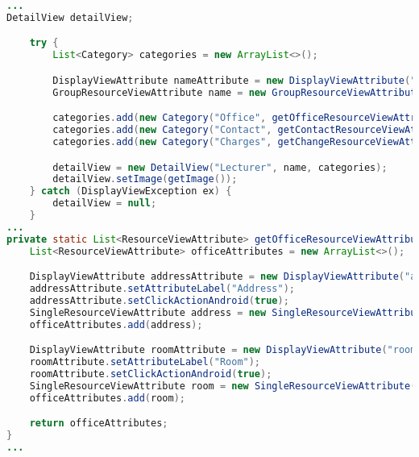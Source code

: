 \newpage

\begin{lstlisting}[label=lst:detailview_impl,
language=java,
firstnumber=1,
caption=Erstellung einer \textit{DetailView}.]				   
...
DetailView detailView;

	try {
		List<Category> categories = new ArrayList<>();

		DisplayViewAttribute nameAttribute = new DisplayViewAttribute("name", ViewAttribute.AttributeType.TEXT);
		GroupResourceViewAttribute name = new GroupResourceViewAttribute(nameAttribute, getViewTitleAttributes());

		categories.add(new Category("Office", getOfficeResourceViewAttributes()));
		categories.add(new Category("Contact", getContactResourceViewAttributes()));
		categories.add(new Category("Charges", getChangeResourceViewAttributes()));

		detailView = new DetailView("Lecturer", name, categories);
		detailView.setImage(getImage());
	} catch (DisplayViewException ex) {
		detailView = null;
	}
...
private static List<ResourceViewAttribute> getOfficeResourceViewAttributes() {
	List<ResourceViewAttribute> officeAttributes = new ArrayList<>();

	DisplayViewAttribute addressAttribute = new DisplayViewAttribute("address", ViewAttribute.AttributeType.LOCATION);
	addressAttribute.setAttributeLabel("Address");
	addressAttribute.setClickActionAndroid(true);
	SingleResourceViewAttribute address = new SingleResourceViewAttribute(addressAttribute);
	officeAttributes.add(address);

	DisplayViewAttribute roomAttribute = new DisplayViewAttribute("roomNumber", ViewAttribute.AttributeType.TEXT);
	roomAttribute.setAttributeLabel("Room");
	roomAttribute.setClickActionAndroid(true);
	SingleResourceViewAttribute room = new SingleResourceViewAttribute(roomAttribute);
	officeAttributes.add(room);

	return officeAttributes;
}
...
\end{lstlisting}

\newpage

